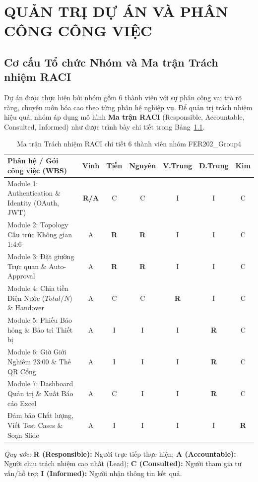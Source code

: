 \chapter{QUẢN TRỊ DỰ ÁN VÀ PHÂN CÔNG CÔNG VIỆC}
\label{ch:project_management}

\section{Cơ cấu Tổ chức Nhóm và Ma trận Trách nhiệm RACI}
Dự án được thực hiện bởi nhóm gồm 6 thành viên với sự phân công vai trò rõ ràng, chuyên môn hóa cao theo từng phân hệ nghiệp vụ. Để quản trị trách nhiệm hiệu quả, nhóm áp dụng mô hình \textbf{Ma trận RACI} (Responsible, Accountable, Consulted, Informed) như được trình bày chi tiết trong Bảng~\ref{tab:raci_matrix}.

\begin{table}[htbp]
\centering
\caption{Ma trận Trách nhiệm RACI chi tiết 6 thành viên nhóm FER202\_Group4}
\label{tab:raci_matrix}
\small
\begin{tabularx}{\textwidth}{|l|c|c|c|c|c|c|}
\hline
\rowcolor{blue!10}
\textbf{Phân hệ / Gói công việc (WBS)} & \textbf{Vinh} & \textbf{Tiến} & \textbf{Nguyên} & \textbf{V.Trung} & \textbf{Đ.Trung} & \textbf{Kim} \\ \hline
Module 1: Authentication \& Identity (OAuth, JWT) & \textbf{R/A} & C & C & I & I & C \\ \hline
Module 2: Topology Cấu trúc Không gian 1:4:6 & A & \textbf{R} & \textbf{R} & I & I & C \\ \hline
Module 3: Đặt giường Trực quan \& Auto-Approval & A & \textbf{R} & \textbf{R} & I & I & C \\ \hline
Module 4: Chia tiền Điện Nước ($Total / N$) \& Handover & A & C & C & \textbf{R} & I & C \\ \hline
Module 5: Phiếu Báo hỏng \& Bảo trì Thiết bị & A & I & I & I & \textbf{R} & C \\ \hline
Module 6: Giờ Giới Nghiêm 23:00 \& Thẻ QR Cổng & A & I & I & I & \textbf{R} & C \\ \hline
Module 7: Dashboard Quản trị \& Xuất Báo cáo Excel & A & C & I & I & \textbf{R} & C \\ \hline
Đảm bảo Chất lượng, Viết Test Cases \& Soạn Slide & A & I & I & I & I & \textbf{R} \\ \hline
\end{tabularx}
\end{table}

\begin{flushleft}
\footnotesize
\textit{Quy ước:} \textbf{R (Responsible):} Người trực tiếp thực hiện; \textbf{A (Accountable):} Người chịu trách nhiệm cao nhất (Lead); \textbf{C (Consulted):} Người tham gia tư vấn/hỗ trợ; \textbf{I (Informed):} Người nhận thông tin kết quả.
\end{flushleft}

